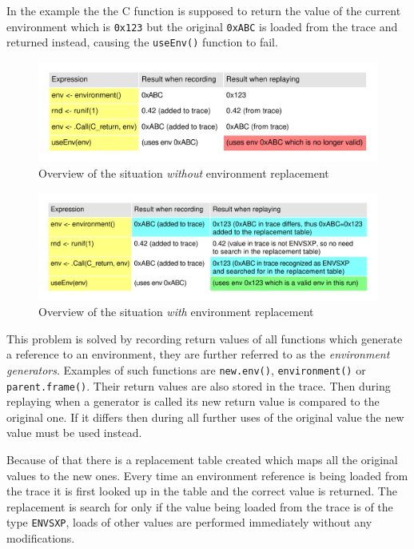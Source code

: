 \documentclass[thesis=M,english,hidelinks]{FITthesis}[2012/10/20]
\begin{document}
		In the example the the C function is supposed to return the value of the current environment which is \lstinline|0x123| but the original \lstinline|0xABC| is loaded from the trace and returned instead, causing the \lstinline|useEnv()| function to fail.\par
		
		\begin{figure}[ht]\centering
			\includegraphics[width=1.0\textwidth]{img/env_replace}
			\caption{Overview of the situation \emph{without} environment replacement}\label{fig:env_replace}
		\end{figure}
		
		\begin{figure}[ht]\centering
			\includegraphics[width=1.0\textwidth]{img/env_replace2}
			\caption{Overview of the situation \emph{with} environment replacement}\label{fig:env_replace2}
		\end{figure}
		
		This problem is solved by recording return values of all functions which generate a reference to an environment, they are further referred to as the \emph{environment generators}. Examples of such functions are \lstinline|new.env()|, \lstinline|environment()| or \lstinline|parent.frame()|. Their return values are also stored in the trace. Then during replaying when a generator is called its new return value is compared to the original one. If it differs then during all further uses of the original value the new value must be used instead.\par
		
		Because of that there is a replacement table created which maps all the original values to the new ones. Every time an environment reference is being loaded from the trace it is first looked up in the table and the correct value is returned. The replacement is search for only if the value being loaded from the trace is of the type \lstinline|ENVSXP|, loads of other values are performed immediately without any modifications.\par
		
\end{document}
